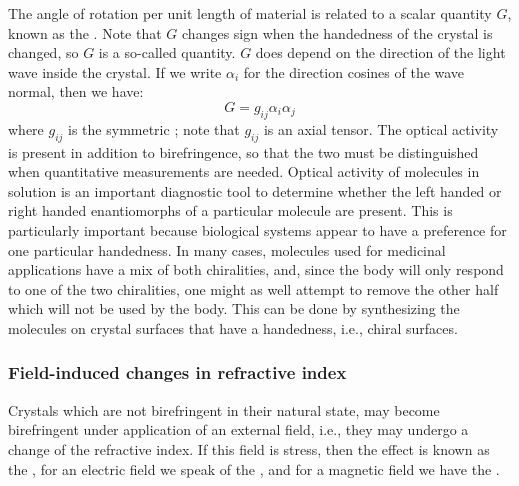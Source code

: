 The angle of rotation per unit length of material is related to a scalar quantity $G$, known as the . Note that $G$ changes sign when the handedness of the crystal is changed, so $G$ is a so-called  quantity. $G$ does depend on the direction of the light wave inside the crystal.  If we write $\alpha_i$ for the direction cosines of the wave normal, then we have:
\[
	G = g_{ij}\alpha_i\alpha_j
\]
where $g_{ij}$ is the symmetric ;  note that $g_{ij}$ is an axial tensor.  The optical activity is present in addition to birefringence, so that the two must be distinguished when quantitative measurements are needed.  Optical activity of molecules in solution is an important diagnostic tool to determine whether the left handed or right handed enantiomorphs of a particular  molecule are present.  This is particularly important because biological systems appear to have a preference for one particular handedness.  In many cases, molecules used for medicinal applications have a mix of both chiralities, and, since the body will only respond to one of the two chiralities, one might as well attempt to remove the other half which will not be used by the body.  This can be done by synthesizing the molecules on crystal surfaces that have a handedness, i.e., chiral surfaces. 

\subsubsection{Field-induced changes in refractive index}

Crystals which are not birefringent in their natural state, may become birefringent under application of an external field, i.e., they may undergo a change of the refractive index. If this field is stress, then the effect is known as the , for an electric field we speak of the , and for a magnetic field we have the . 

